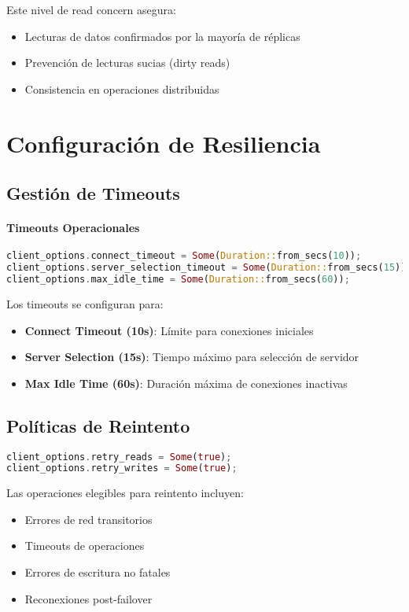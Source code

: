 \documentclass[12pt,letterpaper]{article}
\begin{document}
Este nivel de read concern asegura:
\begin{itemize}
    \item Lecturas de datos confirmados por la mayoría de réplicas
    \item Prevención de lecturas sucias (dirty reads)
    \item Consistencia en operaciones distribuidas
\end{itemize}

\section{Configuración de Resiliencia}
\subsection{Gestión de Timeouts}
\paragraph{Timeouts Operacionales}
\begin{lstlisting}[language=rust]
client_options.connect_timeout = Some(Duration::from_secs(10));
client_options.server_selection_timeout = Some(Duration::from_secs(15));
client_options.max_idle_time = Some(Duration::from_secs(60));
\end{lstlisting}

Los timeouts se configuran para:
\begin{itemize}
    \item \textbf{Connect Timeout (10s)}: Límite para conexiones iniciales
    \item \textbf{Server Selection (15s)}: Tiempo máximo para selección de servidor
    \item \textbf{Max Idle Time (60s)}: Duración máxima de conexiones inactivas
\end{itemize}

\subsection{Políticas de Reintento}
\begin{lstlisting}[language=rust]
client_options.retry_reads = Some(true);
client_options.retry_writes = Some(true);
\end{lstlisting}

Las operaciones elegibles para reintento incluyen:
\begin{itemize}
    \item Errores de red transitorios
    \item Timeouts de operaciones
    \item Errores de escritura no fatales
    \item Reconexiones post-failover
\end{itemize}
\end{document}
